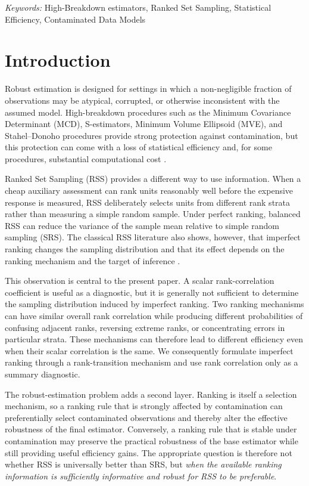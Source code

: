 \documentclass[12pt]{article}
\begin{document}
\noindent%
{\it Keywords:} High-Breakdown estimators, Ranked Set Sampling, Statistical Efficiency, Contaminated Data Models
\vfill

\newpage
{} %

\section{Introduction}
Robust estimation is designed for settings in which a non-negligible fraction of observations may be atypical, corrupted, or otherwise inconsistent with the assumed model. High-breakdown procedures such as the Minimum Covariance Determinant (MCD), S-estimators, Minimum Volume Ellipsoid (MVE), and Stahel--Donoho procedures provide strong protection against contamination, but this protection can come with a loss of statistical efficiency and, for some procedures, substantial computational cost \cite{maronna2019robust,rousseeuw1999fast}.

Ranked Set Sampling (RSS) provides a different way to use information. When a cheap auxiliary assessment can rank units reasonably well before the expensive response is measured, RSS deliberately selects units from different rank strata rather than measuring a simple random sample. Under perfect ranking, balanced RSS can reduce the variance of the sample mean relative to simple random sampling (SRS). The classical RSS literature also shows, however, that imperfect ranking changes the sampling distribution and that its effect depends on the ranking mechanism and the target of inference \cite{McIntyre1952,Wolfe2010,ChenStasnyWolfe2006}.

This observation is central to the present paper. A scalar rank-correlation coefficient is useful as a diagnostic, but it is generally not sufficient to determine the sampling distribution induced by imperfect ranking. Two ranking mechanisms can have similar overall rank correlation while producing different probabilities of confusing adjacent ranks, reversing extreme ranks, or concentrating errors in particular strata. These mechanisms can therefore lead to different efficiency even when their scalar correlation is the same. We consequently formulate imperfect ranking through a rank-transition mechanism and use rank correlation only as a summary diagnostic.

The robust-estimation problem adds a second layer. Ranking is itself a selection mechanism, so a ranking rule that is strongly affected by contamination can preferentially select contaminated observations and thereby alter the effective robustness of the final estimator. Conversely, a ranking rule that is stable under contamination may preserve the practical robustness of the base estimator while still providing useful efficiency gains. The appropriate question is therefore not whether RSS is universally better than SRS, but \emph{when the available ranking information is sufficiently informative and robust for RSS to be preferable}.
\end{document}
